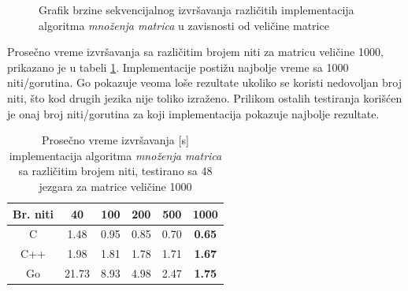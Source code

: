 \documentclass[12pt,oneside]{memoir}
\begin{document}
\begin{figure}
\begin{center}


\caption{Grafik brzine sekvencijalnog izvršavanja različitih implementacija algoritma \textit{množenja matrica} u zavisnosti od veličine matrice}
\label{fig:matrix11}
\end{center}
\end{figure}

Prosečno vreme izvršavanja sa različitim brojem niti za matricu veličine 1000, prikazano je u tabeli \ref{tab:matrix5}. Implementacije postižu najbolje vreme sa 1000 niti/gorutina. Go pokazuje veoma loše rezultate ukoliko se koristi nedovoljan broj niti, što kod drugih jezika nije toliko izraženo. Prilikom ostalih testiranja korišćen je onaj broj niti/gorutina za koji implementacija pokazuje najbolje rezultate. 

\begin{table}
\begin{center}
\caption{Prosečno vreme izvršavanja [s] implementacija algoritma \textit{množenja matrica} sa različitim brojem niti, testirano sa 48 jezgara za matrice veličine 1000}
\begin{tabular}{||c||c c c c c||}
\hline
Br. niti		&40&100 &200 &500 &1000\\ \hline
C		&1.48		&0.95		&0.85		&0.70		&\textbf{0.65} \\ \hline
C++ 		&1.98		&1.81		&1.78		&1.71		&\textbf{1.67} \\ \hline
Go		&21.73	&8.93		&4.98		&2.47		&\textbf{1.75} \\ \hline
\end{tabular}
\label{tab:matrix5}
\end{center}
\end{table}
\end{document}
